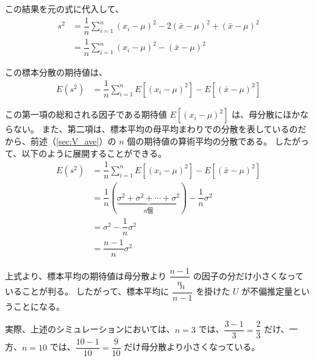 \documentclass[uplatex,11pt,a4paper]{jsarticle}
\begin{document}
この結果を元の式に代入して、
\begin{align*}
s^2
	&=\dfrac{1}{n} \sum_{i=1}^n (x_i-\mu)^2 -2(\bar{x} -\mu)^2 + (\bar{x} -\mu)^2 \\[6pt]
	&=\dfrac{1}{n} \sum_{i=1}^n (x_i-\mu)^2 -(\bar{x} -\mu)^2
\end{align*}

この標本分散の期待値は、
\begin{align*}
E(s^2)
	&=\dfrac{1}{n} \sum_{i=1}^n E [(x_i-\mu)^2] - E[(\bar{x} -\mu)^2]
\end{align*}

この第一項の総和される因子である期待値 $E [(x_i-\mu)^2]$ は、母分散にほかならない。
また、第二項は、標本平均の母平均まわりでの分散を表しているのだから、前述（\ref{sec:V_ave}）の $n$ 個の期待値の算術平均の分散である。
したがって、以下のように展開することができる。
\begin{align*}
E(s^2)
	&=\dfrac{1}{n} \sum_{i=1}^n E [(x_i-\mu)^2] - E[(\bar{x} -\mu)^2] \\[6pt]
	&=\dfrac{1}{n} (\underbrace{\sigma^2 + \sigma^2 + \cdots + \sigma^2}_{n \text{個}}) - \dfrac{1}{n} \sigma^2 \\[6pt]
	&=\sigma^2 - \dfrac{1}{n} \sigma^2 \\[6pt]
	&=\dfrac{n-1}{n} \sigma^2
\end{align*}

上式より、標本平均の期待値は母分散より $\dfrac{n-1}{n}$ の因子の分だけ小さくなっていることが判る。
したがって、標本平均に $\dfrac{n}{n-1}$ を掛けた $U$ が不偏推定量ということになる。

実際、上述のシミュレーションにおいては、$n=3$ では、$\dfrac{3-1}{3}=\dfrac{2}{3}$ だけ、一方、$n=10$ では、$\dfrac{10-1}{10}=\dfrac{9}{10}$ だけ母分散より小さくなっている。
\end{document}
